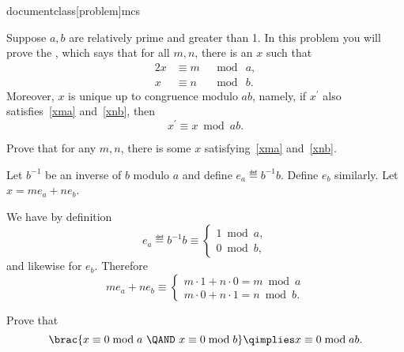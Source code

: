 documentclass[problem]{mcs}

\begin{pcomments}
\end{pcomments}



\begin{problem}
  Suppose $a, b$ are relatively prime and greater than 1.  In this
  problem you will prove the , which
  says that for all $m,n$, there is an $x$ such that
\begin{alignat}{2}
   x &\equiv m &\ \bmod\ a,\label{xma}\\
   x &\equiv n &\ \bmod\ b.\label{xnb}
\end{alignat}
  Moreover, $x$ is unique up to congruence modulo $ab$, namely, if
  $x^\prime$ also satisfies~\eqref{xma} and~\eqref{xnb}, then
\[
x^\prime \equiv x \bmod{ab}.
\]

\bparts

\ppart\label{exmaxnb} Prove that for any $m,n$, there is some $x$
satisfying~\eqref{xma} and~\eqref{xnb}.

\hint Let $b^{-1}$ be an inverse of $b$ modulo $a$ and define $e_a \eqdef
b^{-1}b$.  Define $e_b$ similarly.  Let $x = me_a + ne_b$.

\begin{solution}
We have by definition
\[
e_a \eqdef b^{-1}b \equiv
\begin{cases}
  1 \bmod a,\\
  0 \bmod b,
\end{cases}
\]
and likewise for $e_b$.  Therefore
\[
m e_a+ n e_b \equiv \begin{cases}
                 m\cdot 1 + n \cdot 0 = m \bmod a\\
                 m\cdot 0 + n \cdot 1 = n \bmod b.
                    \end{cases}
\]
\end{solution}

\ppart\label{0congcase} Prove that
\[
\brac{x \equiv 0 \bmod a \ \QAND\  x \equiv 0 \bmod b} \qimplies x \equiv 0 \bmod{ab}.
\]


\end{problem}
